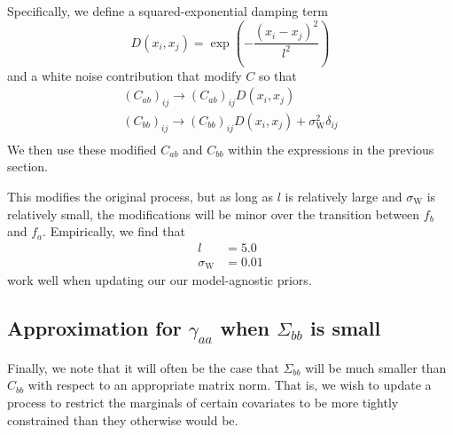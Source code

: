\documentclass[onecolumn]{article}
\begin{document}
Specifically, we define a squared-exponential damping term
\begin{equation}
    D(x_i, x_j) = \exp\left(-\frac{(x_i - x_j)^2}{l^2}\right)
\end{equation}
and a white noise contribution that modify $C$ so that
\begin{gather}
    (C_{ab})_{ij} \rightarrow (C_{ab})_{ij} D(x_i, x_j) \\
    (C_{bb})_{ij} \rightarrow (C_{bb})_{ij} D(x_i, x_j) + \sigma_\mathrm{W}^2 \delta_{ij} \\
\end{gather}
We then use these modified $C_{ab}$ and $C_{bb}$ within the expressions in the previous section.

This modifies the original process, but as long as $l$ is relatively large and $\sigma_\mathrm{W}$ is relatively small, the modifications will be minor over the transition between $f_b$ and $f_a$.
Empirically, we find that
\begin{align}
    l & = 5.0 \\
    \sigma_\mathrm{W} & = 0.01
\end{align}
work well when updating our our model-agnostic priors.


\subsection*{Approximation for $\gamma_{aa}$ when $\Sigma_{bb}$ is small}

Finally, we note that it will often be the case that $\Sigma_{bb}$ will be much smaller than $C_{bb}$ with respect to an appropriate matrix norm.
That is, we wish to update a process to restrict the marginals of certain covariates to be more tightly constrained than they otherwise would be.
\end{document}
